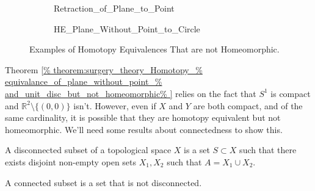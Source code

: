 \documentclass[crop=false,class=article,oneside]{standalone}
\begin{document}
        \begin{figure}[H]
            \centering
            \captionsetup{type=figure}
            \begin{subfigure}[b]{0.33\textwidth}
                \captionsetup{type=figure}
                \centering
                {Retraction_of_Plane_to_Point}
                \label{fig:surgery_theory_course_homotopy_%
                       equivalence_diagram_of_plane_with_point}
            \end{subfigure}
            \begin{subfigure}[b]{0.66\textwidth}
                \captionsetup{type=figure}
                \centering
                
                          {HE_Plane_Without_Point_to_Circle}
                \label{fig:surgery_theory_homotopy_equivalence_%
                       between_the_plane_with_a_point_removed_%
                       and_the_unit_circle}
            \end{subfigure}
            \caption{Examples of Homotopy Equivalences
                     That are not Homeomorphic.}
            \label{%
                fig:surgery_theory_course_various_HE_%
                but_not_homeo_examples%
            }
        \end{figure}
        Theorem \ref{%
            theorem:surgery_theory_Homotopy_%
            equivalance_of_plane_without_point_%
            and_unit_disc_but_not_homeomorphic%
        }
        relies on the fact that $S^{1}$ is compact and
        $\mathbb{R}^{2}\setminus\{(0,0)\}$ isn't.
        However, even if $X$ and $Y$ are both
        compact, and of the same cardinality, it is possible
        that they are homotopy equivalent but not homeomorphic.
        We'll need some results about connectedness to show this.
        \begin{definition}
            A disconnected subset of a topological space $X$
            is a set $S\subset{X}$ such that there exists
            disjoint non-empty open sets $X_{1},X_{2}$ such
            that $A=X_{1}\cup{X_{2}}$.
        \end{definition}
        \begin{definition}
            A connected subset is a set that is not
            disconnected.
        \end{definition}
\end{document}
